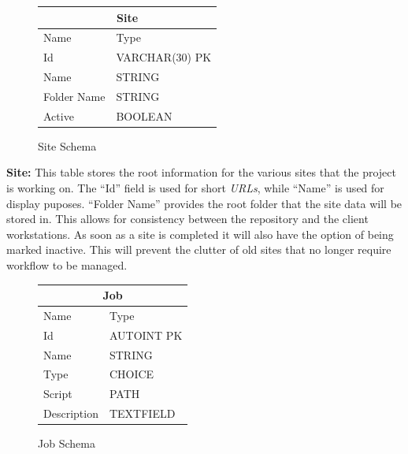 \documentclass[12pt,a4paper]{report}
\begin{document}
\begin{figure}
\begin{tabular}{l|l}
    \multicolumn{2}{c}{Site} \\
    \hline
    Name        & Type \\
    \hline
    Id          & VARCHAR(30) PK \\
    Name        & STRING \\
    Folder Name & STRING \\
    Active      & BOOLEAN \\
\end{tabular}
\caption{Site Schema}
\end{figure}
\noindent\textbf{Site:}
This table stores the root information for the various sites that
the project is working on. The ``Id'' field is used for short
\emph{URLs}, while ``Name'' is used for display puposes. ``Folder Name''
provides the root folder that the site data will be stored in. This
allows for consistency between the repository and the client workstations.
As soon as a site is completed it will also have the option of being marked
inactive. This will prevent the clutter of old sites that no longer require
workflow to be managed.
\\
\begin{figure}
\begin{tabular}{l|l}
    \multicolumn{2}{c}{Job} \\
    \hline
    Name        & Type \\
    \hline
    Id          & AUTOINT PK \\
    Name        & STRING \\
    Type        & CHOICE \\
    Script      & PATH \\
    Description & TEXTFIELD \\
\end{tabular}
\caption{Job Schema}
\end{figure}
\end{document}
